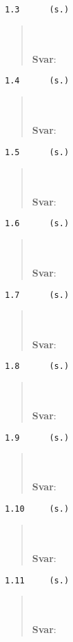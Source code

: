 \documentclass[a4paper]{article}
\newcommand{\tskcol}[1]{\textcolor{tskcol}{#1}}
\begin{document}
\texttt{\tskcol{1.3~~~~~ (s.)}}
\begin{quotation}
	\noindent
	\\ \\
	\textbf{Svar}:
\end{quotation}

\texttt{\tskcol{1.4~~~~~ (s.)}}
\begin{quotation}
	\noindent
	\\ \\
	\textbf{Svar}:
\end{quotation}

\texttt{\tskcol{1.5~~~~~ (s.)}}
\begin{quotation}
	\noindent
	\\ \\
	\textbf{Svar}:
\end{quotation}

\texttt{\tskcol{1.6~~~~~ (s.)}}
\begin{quotation}
	\noindent
	\\ \\
	\textbf{Svar}:
\end{quotation}

\texttt{\tskcol{1.7~~~~~ (s.)}}
\begin{quotation}
	\noindent
	\\ \\
	\textbf{Svar}:
\end{quotation}

\texttt{\tskcol{1.8~~~~~ (s.)}}
\begin{quotation}
	\noindent
	\\ \\
	\textbf{Svar}:
\end{quotation}

\texttt{\tskcol{1.9~~~~~ (s.)}}
\begin{quotation}
	\noindent
	\\ \\
	\textbf{Svar}:
\end{quotation}

\texttt{\tskcol{1.10~~~~ (s.)}}
\begin{quotation}
	\noindent
	\\ \\
	\textbf{Svar}:
\end{quotation}

\texttt{\tskcol{1.11~~~~ (s.)}}
\begin{quotation}
	\noindent
	\\ \\
	\textbf{Svar}:
\end{quotation}
\end{document}
